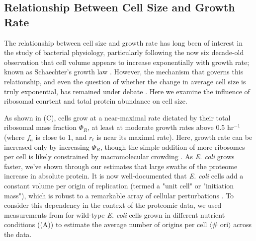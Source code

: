 
\subsection{Relationship Between Cell Size and Growth Rate}
The relationship between cell size and growth rate has long been of interest in
the study of bacterial physiology, particularly following the now six decade-old
observation that cell volume appears to increase exponentially with growth rate;
known as Schaechter's growth law \citep{schaechter1958, taheriaraghi2015}.
However, the mechanism that governs this relationship, and even the question of
whether the change in average cell size is truly exponential, has remained under
debate \citep{harris2018}.  Here we examine the influence of ribosomal conrtent
and total protein abundance on cell size.

As shown in (C), cells grow at a near-maximal rate dictated
by their total ribosomal mass fraction $\Phi_R$, at least at moderate growth
rates above 0.5 hr$^{-1}$ (where $f_a$ is close to 1, and $r_t$ is near its
maximal rate).  Here, growth rate can be increased only by increasing  $\Phi_R$,
though the simple addition of more ribosomes per cell is likely constrained by
macromolecular crowding \citep{delarue2018, solerbistue2020}. As \textit{E.
coli} grows faster, we've shown through our estimates that large swaths of the
proteome increase in absolute protein. It is now well-documented that \textit{E.
coli} cells add a constant volume per origin of replication (termed a "unit
cell" or "initiation mass"), which is robust to a remarkable array of cellular
perturbations \citep{si2017}. To consider this dependency in the context of the
proteomic data, we used measurements from \cite{si2017} for wild-type \textit{E.
coli} cells grown in different nutrient conditions
((A)) to estimate the average number of origins per
cell $\langle$\# ori$\rangle$ across the data.

